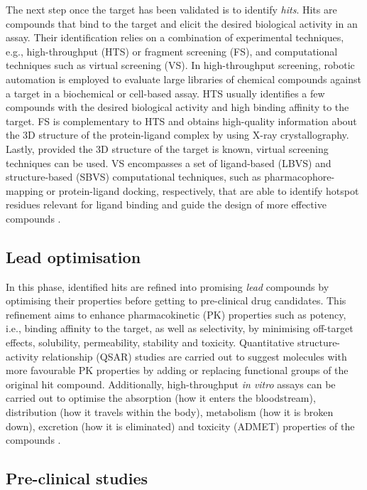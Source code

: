 The next step once the target has been validated is to identify \textit{hits}. Hits are compounds that bind to the target and elicit the desired biological activity in an assay. Their identification relies on a combination of experimental techniques, e.g., high-throughput (HTS) or fragment screening (FS), and computational techniques such as virtual screening (VS). In high-throughput screening, robotic automation is employed to evaluate large libraries of chemical compounds against a target in a biochemical or cell-based assay. HTS usually identifies a few compounds with the desired biological activity and high binding affinity to the target. FS is complementary to HTS and obtains high-quality information about the 3D structure of the protein-ligand complex by using X-ray crystallography. Lastly, provided the 3D structure of the target is known, virtual screening techniques can be used. VS encompasses a set of ligand-based (LBVS) and structure-based (SBVS) computational techniques, such as pharmacophore-mapping or protein-ligand docking, respectively, that are able to identify hotspot residues relevant for ligand binding and guide the design of more effective compounds \cite{SINHA_2018_DD}.

\subsection{Lead optimisation}

In this phase, identified hits are refined into promising \textit{lead} compounds by optimising their properties before getting to pre-clinical drug candidates. This refinement aims to enhance pharmacokinetic (PK) properties such as potency, i.e., binding affinity to the target, as well as selectivity, by minimising off-target effects, solubility, permeability, stability and toxicity. Quantitative structure-activity relationship (QSAR) studies are carried out to suggest molecules with more favourable PK properties by adding or replacing functional groups of the original hit compound. Additionally, high-throughput \textit{in vitro} assays can be carried out to optimise the absorption (how it enters the bloodstream), distribution (how it travels within the body), metabolism (how it is broken down), excretion (how it is eliminated) and toxicity (ADMET) properties of the compounds \cite{SHOU_2020_ADME}.

\subsection{Pre-clinical studies}

